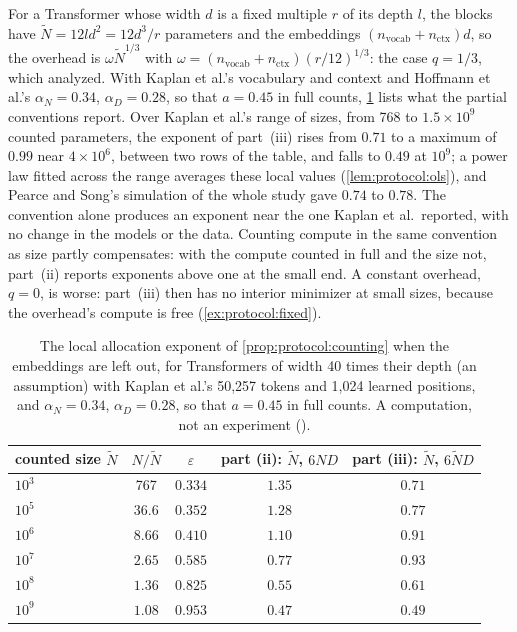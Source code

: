 \begin{refsection}
For a Transformer whose width $d$ is a fixed multiple $r$ of its depth $l$, the blocks have $\tilde N=12ld^2=12d^3/r$ parameters and the embeddings $(n_{\mathrm{vocab}}+n_{\mathrm{ctx}})d$, so the overhead is $\omega\tilde N^{1/3}$ with $\omega=(n_{\mathrm{vocab}}+n_{\mathrm{ctx}})(r/12)^{1/3}$: the case $q=1/3$, which \textcite{PearceSong2024} analyzed. With Kaplan et al.'s vocabulary and context and Hoffmann et al.'s $\alpha_N=0.34$, $\alpha_D=0.28$, so that $a=0.45$ in full counts, \cref{tab:protocol:family} lists what the partial conventions report. Over Kaplan et al.'s range of sizes, from 768 to $1.5\times10^9$ counted parameters, the exponent of part~(iii) rises from $0.71$ to a maximum of $0.99$ near $4\times10^6$, between two rows of the table, and falls to $0.49$ at $10^9$; a power law fitted across the range averages these local values (\cref{lem:protocol:ols}), and Pearce and Song's simulation of the whole study gave $0.74$ to $0.78$. The convention alone produces an exponent near the one Kaplan et al.\ reported, with no change in the models or the data. Counting compute in the same convention as size partly compensates: with the compute counted in full and the size not, part~(ii) reports exponents above one at the small end. A constant overhead, $q=0$, is worse: part~(iii) then has no interior minimizer at small sizes, because the overhead's compute is free (\cref{ex:protocol:fixed}).

\begin{table}[t]
\centering\small
\begin{tabular}{lcccc}
\toprule
counted size $\tilde N$ & $N/\tilde N$ & $\varepsilon$ & part (ii): $\tilde N$, $6ND$ & part (iii): $\tilde N$, $6\tilde ND$\\
\midrule
$10^{3}$ & 767 & $0.334$ & $1.35$ & $0.71$\\
$10^{5}$ & $36.6$ & $0.352$ & $1.28$ & $0.77$\\
$10^{6}$ & $8.66$ & $0.410$ & $1.10$ & $0.91$\\
$10^{7}$ & $2.65$ & $0.585$ & $0.77$ & $0.93$\\
$10^{8}$ & $1.36$ & $0.825$ & $0.55$ & $0.61$\\
$10^{9}$ & $1.08$ & $0.953$ & $0.47$ & $0.49$\\
\bottomrule
\end{tabular}
\caption{The local allocation exponent of \cref{prop:protocol:counting} when the embeddings are left out, for Transformers of width 40 times their depth (an assumption) with Kaplan et al.'s 50,257 tokens and 1,024 learned positions, and $\alpha_N=0.34$, $\alpha_D=0.28$, so that $a=0.45$ in full counts. A computation, not an experiment ().}
\label{tab:protocol:family}
\end{table}


\end{refsection}
